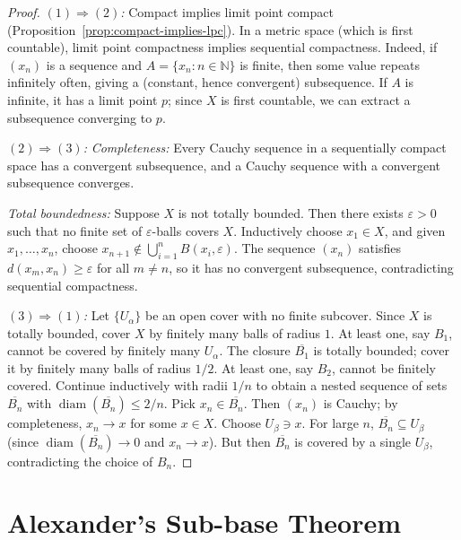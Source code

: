 \documentclass[11pt,a4paper,twoside]{book}
\theoremstyle{remark}
\theoremstyle{definition}
\theoremstyle{definition}
\begin{document}
\begin{proof}
\emph{$(1) \Rightarrow (2)$:}
Compact implies limit point compact (Proposition~\ref{prop:compact-implies-lpc}).
In a metric space (which is first countable), limit point compactness implies
sequential compactness.  Indeed, if $(x_n)$ is a sequence and
$A = \{x_n : n \in \mathbb{N}\}$ is finite, then some value repeats infinitely
often, giving a (constant, hence convergent) subsequence.  If $A$ is infinite,
it has a limit point $p$; since $X$ is first countable, we can extract a
subsequence converging to $p$.

\emph{$(2) \Rightarrow (3)$:}
\textit{Completeness:}  Every Cauchy sequence in a sequentially compact space
has a convergent subsequence, and a Cauchy sequence with a convergent
subsequence converges.

\textit{Total boundedness:}  Suppose $X$ is not totally bounded.  Then there
exists $\varepsilon > 0$ such that no finite set of $\varepsilon$-balls covers
$X$.  Inductively choose $x_1 \in X$, and given $x_1, \ldots, x_n$, choose
$x_{n+1} \notin \bigcup_{i=1}^n B(x_i, \varepsilon)$.  The sequence $(x_n)$
satisfies $d(x_m, x_n) \ge \varepsilon$ for all $m \neq n$, so it has no
convergent subsequence, contradicting sequential compactness.

\emph{$(3) \Rightarrow (1)$:}
Let $\{U_\alpha\}$ be an open cover with no finite subcover.  Since $X$ is
totally bounded, cover $X$ by finitely many balls of radius $1$.  At least one,
say $B_1$, cannot be covered by finitely many $U_\alpha$.  The closure
$\overline{B_1}$ is totally bounded; cover it by finitely many balls of radius
$1/2$.  At least one, say $B_2$, cannot be finitely covered.  Continue
inductively with radii $1/n$ to obtain a nested sequence of sets
$\overline{B_n}$ with $\operatorname{diam}(\overline{B_n}) \le 2/n$.  Pick
$x_n \in \overline{B_n}$.  Then $(x_n)$ is Cauchy; by completeness,
$x_n \to x$ for some $x \in X$.  Choose $U_\beta \ni x$.  For large $n$,
$\overline{B_n} \subseteq U_\beta$ (since $\operatorname{diam}(\overline{B_n})
\to 0$ and $x_n \to x$).  But then $\overline{B_n}$ is covered by a single
$U_\beta$, contradicting the choice of $B_n$.
\end{proof}

\section{Alexander's Sub-base Theorem}
\label{sec:alexander}
\end{document}

